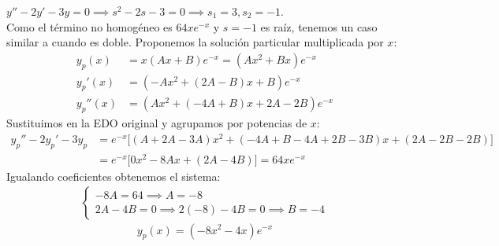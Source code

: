 \documentclass[11pt, a4paper]{article}
\begin{document}
\begin{itemize}
$y''-2y'-3y=0 \implies s^2-2s-3=0 \implies s_1=3, s_2=-1$. \\
Como el término no homogéneo es $64xe^{-x}$ y $s=-1$ es raíz, tenemos un caso similar a cuando es doble. Proponemos la solución particular multiplicada por $x$:
\begin{align*}
y_p(x) &= x(Ax+B)e^{-x} = (Ax^2+Bx)e^{-x} \\
y_p'(x) &= (-Ax^2 + (2A-B)x + B)e^{-x} \\
y_p''(x) &= (Ax^2 + (-4A+B)x + 2A-2B)e^{-x}
\end{align*}
Sustituimos en la EDO original y agrupamos por potencias de $x$:
\begin{align*}
y_p'' - 2y_p' - 3y_p &= e^{-x}\big[ (A+2A-3A)x^2 + (-4A+B-4A+2B-3B)x + (2A-2B-2B) \big] \\
&= e^{-x}\big[ 0x^2 - 8Ax + (2A-4B) \big] = 64xe^{-x}
\end{align*}
Igualando coeficientes obtenemos el sistema:
\begin{align*}
\begin{cases} -8A = 64 \implies A = -8 \\ 2A - 4B = 0 \implies 2(-8) - 4B = 0 \implies B = -4 \end{cases}
\end{align*}
\[
\boxed{y_p(x) = (-8x^2 - 4x)e^{-x}}
\]


\end{itemize}
\end{document}
